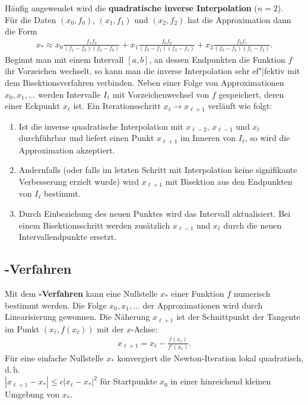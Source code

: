Häufig angewendet wird die
\textbf{quadratische inverse Interpolation} ($n = 2$). \\
Für die Daten $(x_0, f_0)$, $(x_1, f_1)$ und $(x_2, f_2)$ hat die
Approximation dann die Form
\begin{align*}
    x_\ast \approx
    x_0 \frac{f_1 f_2}{(f_1 - f_0)(f_2 - f_0)} +
    x_1 \frac{f_0 f_2}{(f_0 - f_1)(f_2 - f_1)} +
    x_2 \frac{f_0 f_1}{(f_0 - f_2)(f_1 - f_2)}.
\end{align*}
Beginnt man mit einem Intervall $[a, b]$, an dessen Endpunkten
die Funktion $f$ ihr Vorzeichen wechselt, so kann man die inverse Interpolation
sehr ef"|fektiv mit dem Bisektionsverfahren verbinden.
Neben einer Folge von Approximationen $x_0, x_1, \dotsc$ werden Intervalle
$I_\ell$ mit Vorzeichenwechsel von $f$ gespeichert, deren einer
Eckpunkt $x_\ell$ ist. Ein Iterationsschritt $x_\ell \rightarrow x_{\ell+1}$
verläuft wie folgt:
\begin{enumerate}
    \item
    Ist die inverse quadratische Interpolation mit $x_{\ell-2}$, $x_{\ell-1}$
    und $x_\ell$ durchführbar und liefert einen Punkt $x_{\ell+1}$ im Inneren
    von $I_\ell$, so wird die Approximation akzeptiert.

    \item
    Andernfalls (oder falls im letzten Schritt mit Interpolation keine
    signifikante Verbesserung erzielt wurde) wird $x_{\ell+1}$ mit Bisektion
    aus den Endpunkten von $I_\ell$ bestimmt.

    \item
    Durch Einbeziehung des neuen Punktes wird das Intervall aktualisiert.
    Bei einem Bisektionsschritt werden zusätzlich $x_{\ell-1}$ und $x_\ell$
    durch die neuen Intervallendpunkte ersetzt.
\end{enumerate}

\pagebreak

\subsection{%
    -Verfahren%
}

Mit dem \textbf{-Verfahren} kann eine Nullstelle $x_\ast$ einer
Funktion $f$ numerisch bestimmt werden.
Die Folge $x_0, x_1, \dotsc$ der Approximationen wird durch Linearisierung
gewonnen.
Die Näherung $x_{\ell+1}$ ist der Schnittpunkt der Tangente im
Punkt $(x_\ell, f(x_\ell))$ mit der $x$-Achse:
\begin{align*}
    x_{\ell+1} = x_\ell - \frac{f(x_\ell)}{f'(x_\ell)}.
\end{align*}
Für eine einfache Nullstelle $x_\ast$ konvergiert die Newton-Iteration
lokal quadratisch, d.\,h. \\
$|x_{\ell+1} - x_\ast| \le c |x_\ell - x_\ast|^2$
für Startpunkte $x_0$ in einer hinreichend kleinen Umgebung von $x_\ast$.

